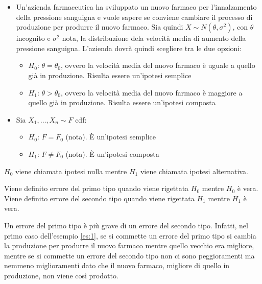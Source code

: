 \documentclass[hidelinks, 10pt]{report}
\begin{document}
\begin{es}	\label{es:1}
\noindent
\begin{itemize}
\item Un'azienda farmaceutica ha sviluppato un nuovo farmaco per l'innalzamento della pressione sanguigna e vuole sapere se conviene cambiare il processo di produzione per produrre il nuovo farmaco. Sia quindi $ X \sim N(\theta, \sigma^2) $, con $ \theta $ incognito e $ \sigma^2 $ nota, la distribuzione dela velocit\`a media di aumento della pressione sanguigna. L'azienda dovr\`a quindi scegliere tra le due opzioni:

\begin{itemize}
\item $ H_0 $: $ \theta = \theta_0 $, ovvero la velocit\`a media del nuovo farmaco \`e uguale a quello gi\`a in produzione. Risulta essere un'ipotesi semplice
\item $ H_1 $: $ \theta > \theta_0 $, ovvero la velocit\`a media del nuovo farmaco \`e maggiore a quello gi\`a in produzione. Risulta essere un'ipotesi composta
\end{itemize} 
\item Sia $ X_1, \dotsc, X_n \sim F $ cdf:
\begin{itemize}
\item $ H_0 $: $ F = F_0 $ (nota). \`E un'ipotesi semplice
\item $ H_1 $: $ F \ne F_0 $ (nota). \`E un'ipotesi composta
\end{itemize}
\end{itemize}
\end{es}

\begin{defn}
$ H_0 $ viene chiamata ipotesi nulla mentre $ H_1 $ viene chiamata ipotesi alternativa.
\end{defn}

\begin{defn}
Viene definito errore del primo tipo quando viene rigettata $ H_0 $ mentre $ H_0 $ \`e vera. Viene definito errore del secondo tipo quando viene rigettata $ H_1 $ mentre $ H_1 $ \`e vera.
\end{defn}

Un errore del primo tipo \`e pi\`u grave di un errore del secondo tipo. Infatti, nel primo caso dell'esempio \ref{es:1}, se si commette un errore del primo tipo si cambia la produzione per produrre il nuovo farmaco mentre quello vecchio era migliore, mentre se si commette un errore del secondo tipo non ci sono peggioramenti ma nemmeno miglioramenti dato che il nuovo farmaco, migliore di quello in produzione, non viene cos\`i prodotto.
 
\end{document}
